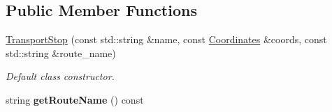 \subsection*{Public Member Functions}
\begin{DoxyCompactItemize}
\item 
\hyperlink{class_transport_stop_af12f0e4489f285dc6d4ba723b8f026d1}{Transport\+Stop} (const std\+::string \&name, const \hyperlink{class_coordinates}{Coordinates} \&coords, const std\+::string \&route\+\_\+name)
\begin{DoxyCompactList}\small\item\em Default class constructor. \end{DoxyCompactList}\item 
\hypertarget{class_transport_stop_a6ff14aa5560dee86b741720a670eaf52}{}string {\bfseries get\+Route\+Name} () const \label{class_transport_stop_a6ff14aa5560dee86b741720a670eaf52}


\end{DoxyCompactItemize}
